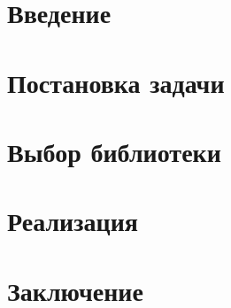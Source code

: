 


\usepackage{caption}
\usepackage{listings}
\usepackage{comment}

\newcommand{\ReScript}{\textsc{ReScript}}




\maketitle
\setcounter{tocdepth}{2}
\tableofcontents

\section{Введение}
\label{sec:intro}


\section{Постановка задачи}
\label{sec:task}


\section{Выбор библиотеки}
\label{sec:libs}


\section{Реализация}
\label{sec:approach}


\section{Заключение}
\label{sec:conclusion}


\nocite{*}
\setmonofont[Mapping=tex-text]{CMU Typewriter Text}



